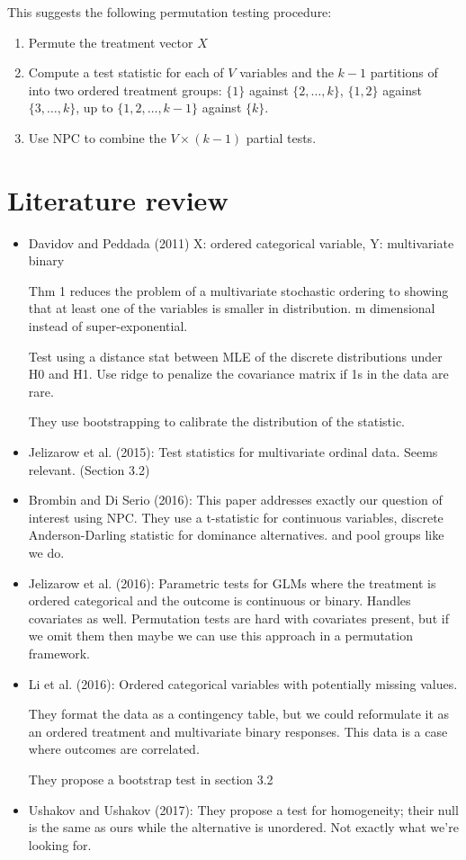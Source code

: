 \documentclass[12pt]{article}
\begin{document}
This suggests the following permutation testing procedure:

\begin{enumerate}
\item Permute the treatment vector $X$
\item Compute a test statistic for each of $V$ variables and the $k-1$ partitions of into two ordered treatment groups: 
$\{1\}$ against $\{2, \ldots, k\}$,
$\{1, 2\}$ against $\{3, \ldots, k\}$,
up to $\{1, 2, \ldots, k-1\}$ against $\{k\}$.
\item Use NPC to combine the $V \times (k-1)$ partial tests.
\end{enumerate}

\section{Literature review}
\begin{itemize}
\item Davidov and Peddada (2011) 
X: ordered categorical variable, Y: multivariate binary

Thm 1 reduces the problem of a multivariate stochastic ordering to showing that at least one of the variables is smaller in distribution. m dimensional instead of super-exponential.

Test using a distance stat between MLE of the discrete distributions under H0 and H1. Use ridge to penalize the covariance matrix if 1s in the data are rare.

They use bootstrapping to calibrate the distribution of the statistic.
\item Jelizarow et al. (2015): Test statistics for multivariate ordinal data. Seems relevant. (Section 3.2)
\item Brombin and Di Serio (2016): This paper addresses exactly our question of interest using NPC. They use a t-statistic for continuous variables, discrete Anderson-Darling statistic for dominance alternatives. and pool groups like we do.
\item Jelizarow et al. (2016): Parametric tests for GLMs where the treatment is ordered categorical and the outcome is continuous or binary. Handles covariates as well. Permutation tests are hard with covariates present, but if we omit them then maybe we can use this approach in a permutation framework.
\item Li et al. (2016): Ordered categorical variables with potentially missing values.

They format the data as a contingency table, but we could reformulate it as an ordered treatment and multivariate binary responses. This data is a case where outcomes are correlated.

They propose a bootstrap test in section 3.2
\item Ushakov and Ushakov (2017): They propose a test for homogeneity; their null is the same as ours while the alternative is unordered. Not exactly what we're looking for.
\end{itemize}
\end{document}
